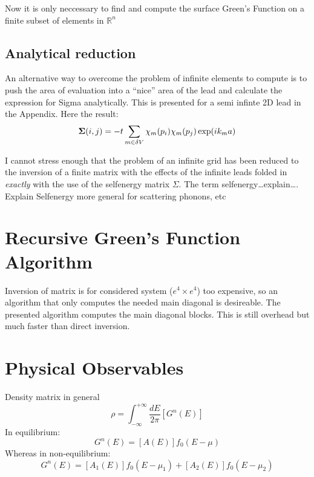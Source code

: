 Now it is only neccessary to find and compute the surface Green's Function on a finite subset of elements in $\mathbb{R}^n$

\subsection*{Analytical reduction}
An alternative way to overcome the problem of infinite elements to compute is to push the area of evaluation into a ``nice'' area of the lead
and calculate the expression for Sigma analytically. This is presented for a semi infinte 2D lead in the Appendix. Here the result:
\begin{equation}
	\mbox{\boldmath$ \Sigma $}(i,j) = -t \sum_{m \in \delta V} \chi_m(p_i) \chi_m(p_j) \exp(ik_m a)
	\label{analytic surface greenfunction}
\end{equation}

I cannot stress enough that the problem of an infinite grid has been reduced to the inversion of a finite matrix with the effects of the
infinite leads folded in \emph{exactly} with the use of the selfenergy matrix $\Sigma$. 
The term selfenergy\ldots explain\ldots.
Explain Selfenergy more general for scattering phonons, etc

\section{Recursive Green's Function Algorithm}
Inversion of matrix is for considered system ($e^4 \times  e^4$) too expensive, so an algorithm that only computes the needed main
diagonal is desireable. The presented algorithm computes the main diagonal blocks. This is still overhead but much faster than
direct inversion.


\section{Physical Observables}

Density matrix in general
\begin{equation}
	\rho = \int_{-\infty}^{+\infty}\frac{dE}{2 \pi} \left[G^n(E)\right]
	\label{densmatrixgeneral}
\end{equation}
In equilibrium:
\begin{equation}
	G^n(E) = [A(E)]f_0(E-\mu)
	\label{correlation function equi}
\end{equation}
Whereas in non-equilibrium:
\begin{equation}
	G^n(E) = [A_1(E)]f_0(E-\mu_1)+[A_2(E)]f_0(E-\mu_2)
	\label{correlation function non-equi}
\end{equation}

